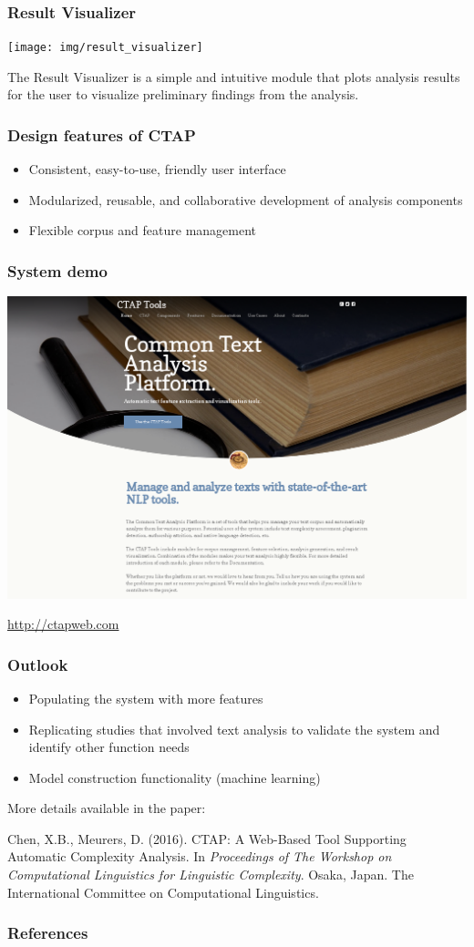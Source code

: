 \documentclass{beamer}
\begin{document}
	\begin{frame}
		\frametitle{Result Visualizer}

				  \texttt{[image: img/result\_visualizer]}

					The Result Visualizer is a simple and intuitive module that
					plots analysis results for the user to visualize preliminary
					findings from the analysis.
	\end{frame}
	
	\begin{frame}
		\frametitle{Design features of CTAP}
		
		\begin{itemize}
			\item Consistent, easy-to-use, friendly user interface
			\item Modularized, reusable, and collaborative development of analysis
			components
			\item Flexible corpus and feature management
		\end{itemize}

	\end{frame}

	\begin{frame}
		\frametitle{System demo}

		\centering
		\includegraphics[width=.8\textwidth]{img/ctapweb}

		\url{http://ctapweb.com}
	\end{frame}

	\begin{frame}
		\frametitle{Outlook}

		\begin{itemize}
			\item Populating the system with more features
			\item Replicating studies that involved text analysis to validate the
			system and identify other function needs 
			\item Model construction functionality (machine learning)
		\end{itemize}

		More details available in the paper:

		\scriptsize{
		Chen, X.B., Meurers, D. (2016). CTAP: A Web-Based Tool Supporting
		Automatic Complexity Analysis. In \textit{Proceedings of The Workshop on
		Computational Linguistics for Linguistic Complexity}. Osaka, Japan. The
		International Committee on Computational Linguistics.}

	\end{frame}

	\begin{frame}
		\frametitle{References}
		\tiny
		

	\end{frame}
	
\end{document}
